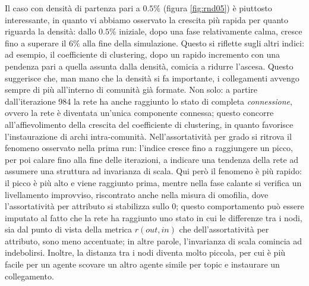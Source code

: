 \documentclass[a4paper,12pt]{article}
\begin{document}
Il caso con densità di partenza pari a $0.5\%$ (figura \ref{fig:rnd05}) è piuttosto interessante, in quanto vi abbiamo osservato la crescita più rapida per quanto riguarda la densità: dallo $0.5\%$ iniziale, dopo una fase relativamente calma, cresce fino a superare il $6\%$ alla fine della simulazione. Questo si riflette sugli altri indici: ad esempio, il coefficiente di clustering, dopo un rapido incremento con una pendenza pari a quella assunta dalla densità, comicia a ridurre l'ascesa. Questo suggerisce che, man mano che la densità si fa importante, i collegamenti avvengo sempre di più all'interno di comunità già formate. Non solo: a partire dall'iterazione 984 la rete ha anche raggiunto lo stato di completa \textit{connessione}, ovvero la rete è diventata un'unica componente connessa; questo concorre all'affievolimento della crescita del coefficiente di clustering, in quanto favorisce l'instaurazione di archi intra-comunità. Nell'assortatività per grado si ritrova il fenomeno osservato nella prima run: l'indice cresce fino a raggiungere un picco, per poi calare fino alla fine delle iterazioni, a indicare una tendenza della rete ad assumere una struttura ad invarianza di scala. Qui però il fenomeno è più rapido: il picco è più alto e viene raggiunto prima, mentre nella fase calante si verifica un livellamento improvviso, riscontrato anche nella misura di omofilia, dove l'assortatività per attributo si stabilizza sullo 0; questo comportamento può essere imputato al fatto che la rete ha raggiunto uno stato in cui le differenze tra i nodi, sia dal punto di vista della metrica $r(out,in)$ che dell'assortatività per attributo, sono meno accentuate; in altre parole, l'invarianza di scala comincia ad indebolirsi. Inoltre, la distanza tra i nodi diventa molto piccola, per cui è più facile per un agente scovare un altro agente simile per topic e instaurare un collegamento. 
\end{document}

